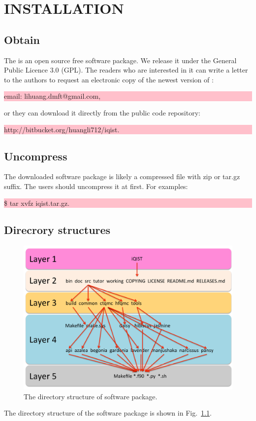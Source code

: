\chapter{INSTALLATION}
\section{Obtain}

The {\iqist} is an open source free software package. We release it under the General Public Licence 3.0 (GPL). The readers who are interested in it can write a letter to the authors to request an electronic copy of the newest version of {\iqist}:
 
\noindent\colorbox{pink}{\parbox[r]{\linewidth}{\quad email: lihuang.dmft@gmail.com,}}
or they can download it directly from the public code repository:

\noindent\colorbox{pink}{\parbox[r]{\linewidth}{\quad http://bitbucket.org/huangli712/iqist.}}

\section{Uncompress}

The downloaded {\iqist} software package is likely a compressed file with zip or tar.gz suffix. The users should uncompress it at first. For examples:

\noindent\colorbox{pink}{\parbox[r]{\linewidth}{\quad \$ tar xvfz iqist.tar.gz.}}

\section{Direcrory structures}
\begin{figure}[ht]
\centering
\includegraphics[scale=0.6]{figure/dir.pdf}
\caption{The directory structure of {\iqist} software package.\label{fig:dir}}
\end{figure}
The directory structure of the {\iqist} software package is shown in Fig.~\ref{fig:dir}.

